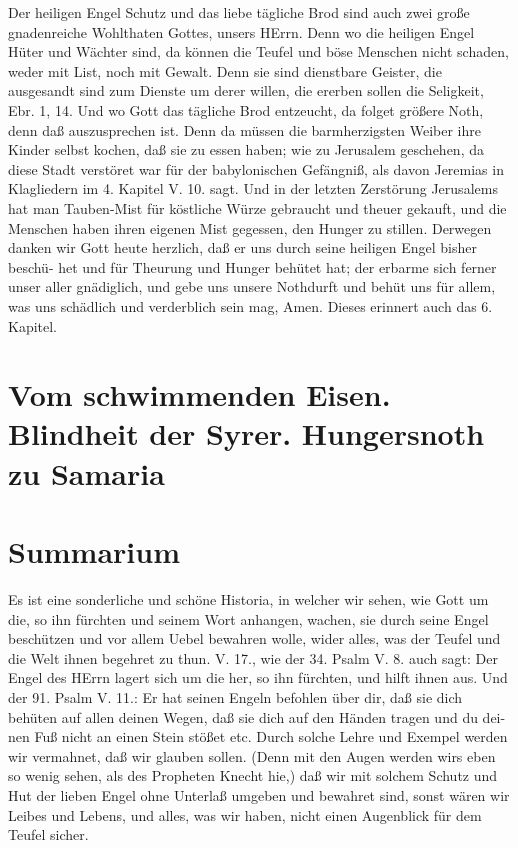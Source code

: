 Der heiligen Engel Schutz und das liebe tägliche Brod sind auch zwei große gnadenreiche Wohlthaten Gottes, unsers HErrn. Denn wo die heiligen Engel Hüter und Wächter sind, da können die Teufel und böse Menschen nicht schaden, weder mit List, noch mit Gewalt. Denn sie sind dienstbare Geister, die ausgesandt sind zum Dienste um derer willen, die ererben sollen die Seligkeit, Ebr. 1, 14. Und wo Gott das tägliche Brod entzeucht, da folget größere Noth, denn daß auszusprechen ist. Denn da müssen die barmherzigsten Weiber ihre Kinder selbst kochen, daß sie zu essen haben; wie zu Jerusalem geschehen, da diese Stadt verstöret war für der babylonischen Gefängniß, als davon Jeremias in Klagliedern im 4. Kapitel V. 10. sagt. Und in der letzten Zerstörung Jerusalems hat man Tauben-Mist für köstliche Würze gebraucht und theuer gekauft, und die Menschen haben ihren eigenen Mist gegessen, den Hunger zu stillen. Derwegen danken wir Gott heute herzlich, daß er uns durch seine heiligen Engel bisher beschü-
het und für Theurung und Hunger behütet hat; der erbarme sich ferner unser aller gnädiglich, und gebe uns unsere Nothdurft und behüt uns für allem, was uns schädlich und verderblich sein mag, Amen. Dieses erinnert auch das 6. Kapitel.

\section[Vom schwimmenden Eisen. Blindheit der Syrer. Hungersnoth zu]{Vom schwimmenden Eisen. Blindheit der Syrer. Hungersnoth zu Samaria}

\section{Summarium}

Es ist eine sonderliche und schöne Historia, in welcher wir sehen, wie Gott um die, so ihn fürchten und seinem Wort anhangen, wachen, sie durch seine Engel beschützen und vor allem Uebel bewahren wolle, wider alles, was der Teufel und die Welt ihnen begehret zu thun. V. 17., wie der 34. Psalm V. 8. auch sagt: Der Engel des HErrn lagert sich um die her, so ihn fürchten, und hilft ihnen aus. Und der 91. Psalm V. 11.: Er hat seinen Engeln befohlen über dir, daß sie dich behüten auf allen deinen Wegen, daß sie dich auf den Händen tragen und du dei-
nen Fuß nicht an einen Stein stößet etc. Durch solche Lehre und Exempel werden wir vermahnet, daß wir glauben sollen. (Denn mit den Augen werden wirs eben so wenig sehen, als des Propheten Knecht hie,) daß wir mit solchem Schutz und Hut der lieben Engel ohne Unterlaß umgeben und bewahret sind, sonst wären wir Leibes und Lebens, und alles, was wir haben, nicht einen Augenblick für dem Teufel sicher.

